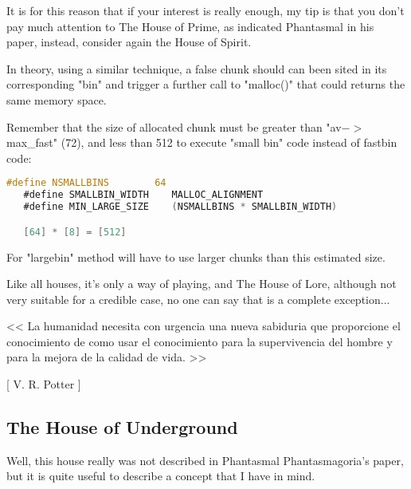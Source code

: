 \documentclass[12pt]{article}
\begin{document}
It is for this reason that if your interest is really enough, my tip is
that you don't pay much attention to The House of Prime, as indicated
Phantasmal in his paper, instead, consider again the House of Spirit.
\newline


In theory, using a similar technique, a false chunk should can been sited
in its corresponding "bin" and trigger a further call to "malloc()" that
could returns the same memory space.
\newline


Remember that the size of allocated chunk must be greater than
"av$->$max\_fast" (72), and less than 512 to execute "small bin" code instead
of fastbin code:

\begin{lstlisting}[language=C]
   #define NSMALLBINS        64
   #define SMALLBIN_WIDTH    MALLOC_ALIGNMENT
   #define MIN_LARGE_SIZE    (NSMALLBINS * SMALLBIN_WIDTH)

   [64] * [8] = [512]
\end{lstlisting}

For "largebin" method will have to use larger chunks than this estimated
size.
\newline


Like all houses, it's only a way of playing, and The House of Lore,
although not very suitable for a credible case, no one can say that
is a complete exception...

\begin{verbnobox}[\small]

                   << La humanidad necesita con urgencia
                      una nueva sabiduria que proporcione
                      el conocimiento de como usar el
                      conocimiento para la supervivencia
                      del hombre y para la mejora de la
                      calidad de vida. >>

                                         [ V. R. Potter ]

\end{verbnobox}

\subsection{The House of Underground}

Well, this house really was not described in Phantasmal Phantasmagoria's
paper, but it is quite useful to describe a concept that I have in mind.
\newline
\end{document}
